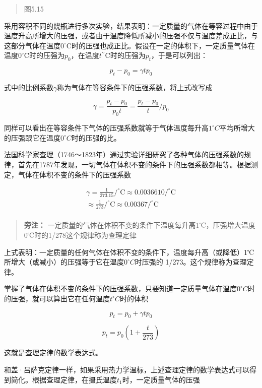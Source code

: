 \begin{quote}
图5.15
\end{quote}

采用容积不同的烧瓶进行多次实验，结果表明：一定质量的气体在等容过程中由于温度升高所增大的压强，或者由于温度降低所减小的压强不仅与温度差成正比，与这部分气体在温度\(0^{\circ}\mathrm{C}\)时的压强也成正比。假设在一定的体积下，一定质量气体在温度\(0^{\circ}\mathrm{C}\)时的压强为\(p_0\)，在温度\(t^{\prime \prime}\mathrm{C}\)时的压强为\(p_t\)，于是可以列出：

\[
p _ {t} - p _ {0} = \gamma t p _ {0} \tag {5.6}
\]

式中的比例系数\(\gamma\)称为气体在等容条件下的压强系数，将上式改写成

\[
\gamma = \frac {p _ {t} - p _ {0}}{p _ {0} t} = \frac {p _ {t} - p _ {0}}{t} / p _ {0} \tag {5.7}
\]

同样可以看出在等容条件下气体的压强系数就等于气体温度每升高\(1^{\circ}C\)平均所增大的压强跟它在温度\(0^{\circ}C\)时的压强的比。

法国科学家查理（1746～1823年）通过实验详细研究了各种气体的压强系数的规律，首先在1787年发现，一切气体在体积不变的条件下的压强系数都相等。根据测定，气体在体积不变的条件下的压强系数

\[
\begin{array}{l} \gamma = \frac {1}{273.15} / ^ {\circ} \mathrm{C} \approx 0.0036610 / ^ {\circ} \mathrm{C} \\ \approx \frac {1}{273} / ^ {\circ} \mathrm{C} \approx 0.00367 / ^ {\circ} \mathrm{C} \\ \end{array}
\]

\begin{quote}
\textbf{旁注：}
一定质量的气体在体积不变的条件下温度每升高1℃，压强增大温度0℃时的1/278这个规律称为查理定律
\end{quote}

上式表明：一定质量的任何气体在体积不变的条件下，温度每升高（或降低）1℃所增大（或减小）的压强等于它在温度\(0^{\circ}C\)时压强的
1/273。这个规律称为查理定律。

掌握了气体在体积不变的条件下的压强系数，只要知道一定质量气体在温度\(0^{\circ}C\)时的压强，就可以算出它在任何温度\(t^{\circ}C\)时的体积

\[
p _ {t} = p _ {0} + \gamma t p _ {0}
\]

\[
p _ {t} = p _ {0} \left(1 + \frac {t}{273}\right) \tag {5.8}
\]

这就是查理定律的数学表达式。

和盖·吕萨克定律一样，如果采用热力学温标，上述查理定律的数学表达式可以得到简化。根据查理定律，在摄氏温度\(t_1\)时，一定质量气体的压强

